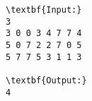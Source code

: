 \begin{verbatim}
\textbf{Input:}
3
3 0 0 3 4 7 7 4 
5 0 7 2 2 7 0 5 
5 7 7 5 3 1 1 3

\textbf{Output:}
4\end{verbatim}